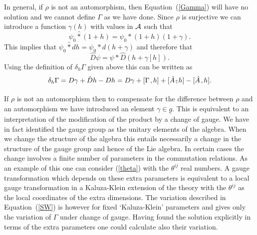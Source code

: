\documentclass[a4paper,12pt]{article}
\def\h#1{\hat #1}
\def\c#1{{\cal #1}}
\def\wm{\mathbin{*}}
\def\hwm{\mathbin{\hat *}}
\def\k{\kern-.1em\mathbin{,}\kern-.1em}
\def\hk{\kern.12em\raise-1em\hbox{$\hat{\raise1em\hbox{,}}$}\kern.12em}
\begin{document}
In general, if $\rho$ is not an automorphism, then
Equation~(\ref{Gamma}) will have no solution and we cannot define
$\Gamma$ as we have done. Since $\rho$ is surjective we can introduce
a function $\gamma(h)$ with values in $\c{A}$ such that 
$$
\psi_0 \hwm (1 + h) = \psi_0 \wm (1 + h)(1 + \gamma).
$$
This implies that $\psi_0 \hwm dh = \psi_0 \wm d(h + \gamma)$ and
therefore that
$$
\h{D} \psi = \psi \wm \h{D} (h + \gamma[h]).
$$
Using the definition of $\delta_h \Gamma$ given above this can be
written as
\begin{equation}
\delta_h \Gamma = D\gamma + \h{D} h - D h = 
D\gamma  + [\Gamma \k h] + [\h{A} \hk h] - [\h{A} \k h].         \label{SW}
\end{equation}
If $\rho$ is not an automorphism then to compensate for the difference
between $\rho$ and an automorphism we have introduced an element
$\gamma \in \underline{g}$.  This is equivalent to an interpretation
of the modification of the product by a change of gauge. We have in
fact identified the gauge group as the unitary elements of the
algebra. When we change the structure of the algebra this entails
necessarily a change in the structure of the gauge group and hence of
the Lie algebra. In certain cases the change involves a finite number
of parameters in the commutation relations. As an example of this one
can consider (\ref{theta}) with the $\theta^{ij}$ real numbers. A
gauge transformation which depends on these extra parameters is
equivalent to a local gauge transformation in a Kaluza-Klein extension
of the theory with the $\theta^{ij}$ as the local coordinates of the
extra dimensions. The variation described in Equation~(\ref{SW}) is
however for fixed `Kaluza-Klein' parameters and gives only the
variation of $\Gamma$ under change of gauge. Having found the
solution explicitly in terms of the extra parameters one could
calculate also their variation. 
\end{document}
